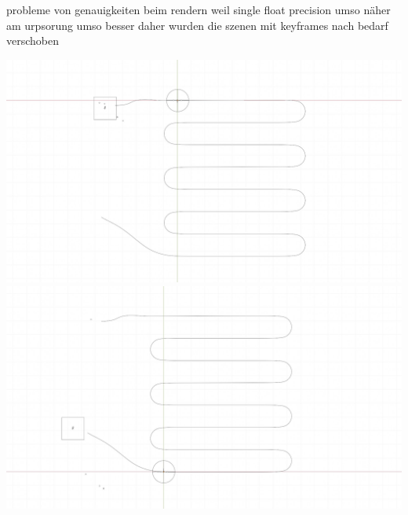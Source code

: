 probleme von genauigkeiten beim rendern
weil single float precision
umso näher am urpsorung umso besser
daher wurden die szenen mit keyframes nach bedarf verschoben

\includegraphics[width=\textwidth]{gfx/prod/plane/flightpath1.jpg}
\includegraphics[width=\textwidth]{gfx/prod/plane/flightpath2.jpg}



